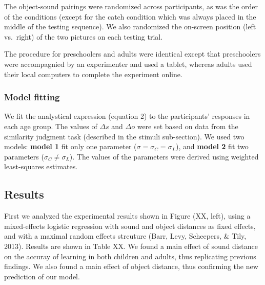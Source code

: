 \documentclass[10pt, letterpaper]{article}
\begin{document}
The object-sound pairings were randomized across participants, as was
the order of the conditions (except for the catch condition which was
always placed in the middle of the testing sequence). We also randomized
the on-screen position (left vs.~right) of the two pictures on each
testing trial.

The procedure for preschoolers and adults were identical except that
preschoolers were accompagnied by an experimenter and used a tablet,
whereas adults used their local computers to complete the experiment
online.

\subsubsection{Model fitting}\label{model-fitting}

We fit the analystical expression (equation 2) to the participants'
responses in each age group. The values of \(\Delta s\) and \(\Delta o\)
were set based on data from the similarity judgment task (described in
the stimuli sub-section). We used two models: \textbf{model 1} fit only
one parameter (\(\sigma = \sigma_C =\sigma_L\)), and \textbf{model 2}
fit two parameters (\(\sigma_C \neq \sigma_L\)). The values of the
parameters were derived using weighted least-squares estimates.

\subsection{Results}\label{results}

First we analyzed the experimental results shown in Figure (XX, left),
using a mixed-effects logistic regression with sound and object
distances as fixed effects, and with a maximal random effects strcuture
(Barr, Levy, Scheepers, \& Tily, 2013). Results are shown in Table XX.
We found a main effect of sound distance on the accuray of learning in
both children and adults, thus replicating previous findings. We also
found a main effect of object distance, thus confirming the new
prediction of our model.
\end{document}

